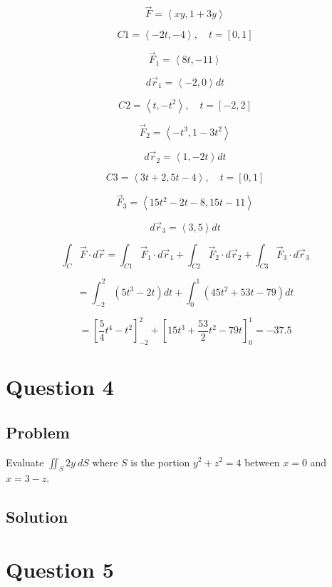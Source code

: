 \documentclass[12pt]{article}
\begin{document}
\[
    \vec{F} = \left\langle xy, 1 + 3y\right\rangle
\]

\[
    C1 = \left\langle -2t, -4\right\rangle, \quad t = [0, 1]
\]

\[
    \vec{F}_1 = \left\langle 8t, -11 \right\rangle
\]

\[
    d \vec{r}_1 = \left\langle -2, 0\right\rangle d t
\]

\[
    C2 = \left\langle t, -t^2\right\rangle, \quad t = [-2, 2]
\]

\[
    \vec{F}_2 = \left\langle -t^3, 1 - 3t^2\right\rangle
\]

\[
    d \vec{r}_2 = \left\langle 1, -2t\right\rangle d t
\]

\[
    C3 = \left\langle 3t + 2, 5t -4\right\rangle, \quad t = [0, 1]
\]

\[
    \vec{F}_3 = \left\langle 15t^2 - 2t - 8, 15t - 11\right\rangle
\]

\[
    d \vec{r}_3 = \left\langle 3, 5\right\rangle d t
\]

\[
    \int_C \vec{F} \cdot d \vec{r}
    = \int_{C1} \vec{F}_1 \cdot d \vec{r}_1
    + \int_{C2} \vec{F}_2 \cdot d \vec{r}_2
    + \int_{C3} \vec{F}_3 \cdot d \vec{r}_3
\]

\[
    = \int_{-2}^{2} \left(5t^3 - 2t\right) d t
    + \int_{0}^{1} \left(45t^2 + 53t - 79\right) d t
\]

\[
    = \left[\frac{5}{4} t^4 - t^2\right]_{-2}^{2}
    + {\left[15t^3 + \frac{53}{2} t^2 - 79t\right]}_{0}^{1}
    = -37.5
\]

\newpage
\section{Question 4}

\subsection{Problem}

Evaluate \(\iint_S 2y\ dS\) where \(S\) is the portion \(y^2 + z^2 = 4\) between \(x = 0\)
and \(x = 3 - z\).

\subsection{Solution}



\newpage
\section{Question 5}
\end{document}
